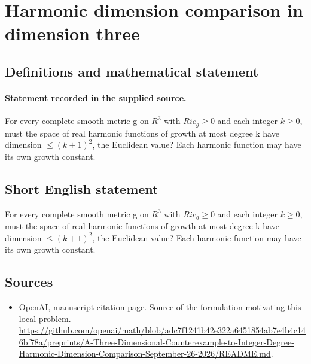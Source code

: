\documentclass[11pt]{article}
\begin{document}
\section*{Harmonic dimension comparison in dimension three}\label{statement}
\subsection{Definitions and mathematical statement}
\paragraph{Statement recorded in the supplied source.}
For every complete smooth metric g on $R^{3}$ with $Ric_g\geq 0$ and each integer $k\geq 0$, must the space of real harmonic functions of growth at most degree k have dimension $\leq (k+1)^{2}$, the Euclidean value? Each harmonic function may have its own growth constant.
\subsection{Short English statement}
For every complete smooth metric g on $R^{3}$ with $Ric_g\geq 0$ and each integer $k\geq 0$, must the space of real harmonic functions of growth at most degree k have dimension $\leq (k+1)^{2}$, the Euclidean value? Each harmonic function may have its own growth constant.
\subsection{Sources}
\begin{itemize}
\item[S1] OpenAI, manuscript citation page. Source of the formulation motivating this local problem.
\url{https://github.com/openai/math/blob/adc7f1241b42e322a6451854ab7e4b4c146bf78a/preprints/A-Three-Dimensional-Counterexample-to-Integer-Degree-Harmonic-Dimension-Comparison-September-26-2026/README.md}.
\end{itemize}
\end{document}
